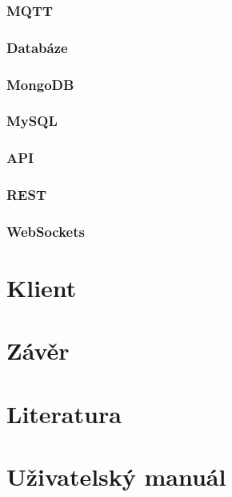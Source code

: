\documentclass{bakalarka}
\begin{document}
			\subsection{MQTT}
	
		\subsection{Databáze}
			\subsection{MongoDB}
		
			\subsection{MySQL}
	
		\subsection{API}
			\subsection{REST}
		
			\subsection{WebSockets}	
	
\chapter{Klient}



\chapter{Závěr}


\chapter*{Literatura}

\chapter*{Uživatelský manuál}


\appendix


\end{document}
